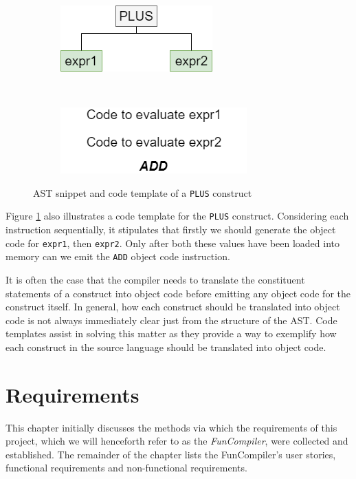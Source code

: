 \documentclass{l4proj}
\begin{document}
\begin{figure}[h]
	\centering
	\begin{subfigure}[b]{0.3\textwidth}
		\includegraphics[scale=0.65]{images/plus.png}
	\end{subfigure}
	~
	\begin{subfigure}[b]{0.3\textwidth}
		\includegraphics[scale=0.65]{images/plus-template.png}
	\end{subfigure}
	\caption{AST snippet and code template of a \texttt{PLUS} construct}\label{fig:plus}	
\end{figure}

Figure \ref{fig:plus} also illustrates a code template for the \texttt{PLUS} construct. Considering each instruction sequentially, it stipulates that firstly we should generate the object code for \texttt{expr1}, then \texttt{expr2}. Only after both these values have been loaded into memory can we emit the \texttt{ADD} object code instruction. 

It is often the case that the compiler needs to translate the constituent statements of a construct into object code before emitting any object code for the construct itself. In general, how each construct should be translated into object code is not always immediately clear just from the structure of the AST. Code templates assist in solving this matter as they provide a way to exemplify how each construct in the source language should be translated into object code. 

\chapter{Requirements}
This chapter initially discusses the methods via which the requirements of this project, which we will henceforth refer to as the \textit{FunCompiler}, were collected and established. The remainder of the chapter lists the FunCompiler's user stories, functional requirements and non-functional requirements.
\end{document}

